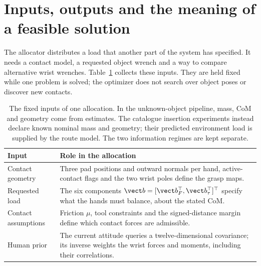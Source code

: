 \section{Inputs, outputs and the meaning of a feasible solution}
\label{sec:socp-interface}

The allocator distributes a load that another part of the system has specified. It needs a contact model, a requested object wrench and a way to compare alternative wrist wrenches. Table~\ref{tab:socp-inputs} collects these inputs. They are held fixed while one problem is solved; the optimizer does not search over object poses or discover new contacts.

\begin{table}[htbp]\centering\small
\begin{tabular}{@{}p{}p{}@{}}\toprule
Input & Role in the allocation\\\midrule
Contact geometry & Three pad positions and outward normals per hand, active-contact flags and the two wrist poles define the grasp maps.\\
Requested load & The six components $\vect b=[\vect b_F^\top,\vect b_\tau^\top]^\top$ specify what the hands must balance, about the stated CoM.\\
Contact assumptions & Friction $\mu$, tool constraints and the signed-distance margin define which contact forces are admissible.\\
Human prior & The current attitude queries a twelve-dimensional covariance; its inverse weights the wrist forces and moments, including their correlations.\\\bottomrule
\end{tabular}
\caption{The fixed inputs of one allocation. In the unknown-object pipeline, mass, CoM and geometry come from estimates. The catalogue insertion experiments instead declare known nominal mass and geometry; their predicted environment load is supplied by the route model. The two information regimes are kept separate.}
\label{tab:socp-inputs}
\end{table}

